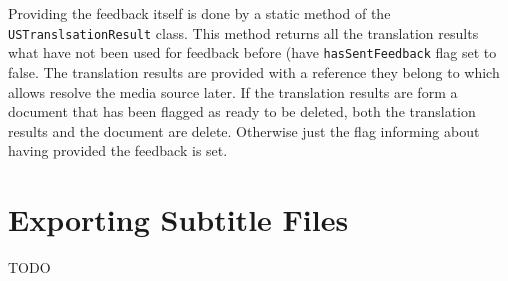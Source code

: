 Providing the feedback itself is done by a static method of the {\tt USTranslsationResult} class. This method returns all the translation results what have not been used for feedback before (have {\tt hasSentFeedback} flag set to false. The translation results are provided with a reference they belong to which allows resolve the media source later. If the translation results are form a document that has been flagged as ready to be deleted, both the translation results and the document are delete. Otherwise just the flag informing about having provided the feedback is set.

\section{Exporting Subtitle Files}
\label{sec:export}

TODO 

